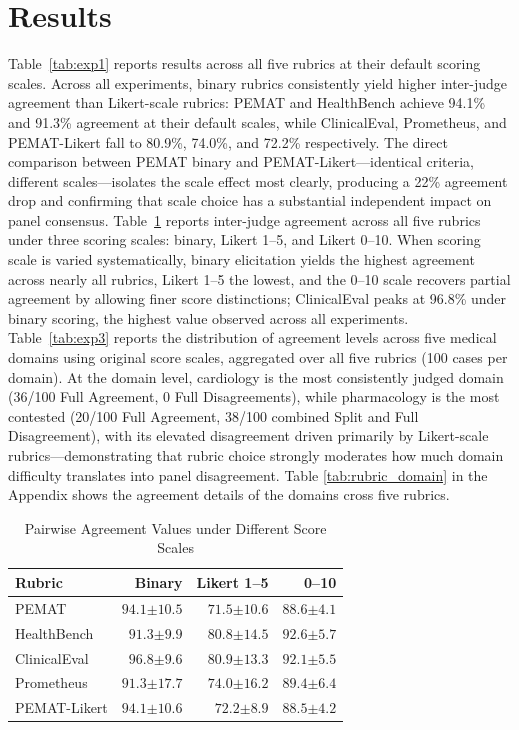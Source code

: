 \documentclass[11pt]{article}
\begin{document}
\section{Results}\label{sec:res1}

Table~\ref{tab:exp1} reports results across all five rubrics at their default scoring scales. Across all experiments, binary rubrics consistently yield higher inter-judge agreement than Likert-scale rubrics: PEMAT and HealthBench achieve 94.1\% and 91.3\% agreement at their default scales, while ClinicalEval, Prometheus, and PEMAT-Likert fall to 80.9\%, 74.0\%, and 72.2\% respectively. The direct comparison between PEMAT binary and PEMAT-Likert—identical criteria, different scales—isolates the scale effect most clearly, producing a 22\% agreement drop and confirming that scale choice has a substantial independent impact on panel consensus. Table~\ref{tab:exp2} reports inter-judge agreement across all five rubrics under three scoring scales: binary, Likert 1--5, and Likert 0--10. When scoring scale is varied systematically, binary elicitation yields the highest agreement across nearly all rubrics, Likert 1--5 the lowest, and the 0--10 scale recovers partial agreement by allowing finer score distinctions; ClinicalEval peaks at 96.8\% under binary scoring, the highest value observed across all experiments. Table~\ref{tab:exp3} reports the distribution of agreement levels across five medical domains using original score scales, aggregated over all five rubrics (100 cases per domain). At the domain level, cardiology is the most consistently judged domain (36/100 Full Agreement, 0 Full Disagreements), while pharmacology is the most contested (20/100 Full Agreement, 38/100 combined Split and Full Disagreement), with its elevated disagreement driven primarily by Likert-scale rubrics—demonstrating that rubric choice strongly moderates how much domain difficulty translates into panel disagreement. Table \ref{tab:rubric_domain} in the Appendix shows the agreement details of the domains cross five rubrics.
\begin{table}[h!]
\centering
\small
\setlength{\tabcolsep}{4pt}
\begin{tabular}{@{}lrrr@{}}
\toprule
\textbf{Rubric} & \textbf{Binary} & \textbf{Likert 1--5}
  & \textbf{0--10} \\
\midrule
PEMAT     & $\mathbf{94.1}{\scriptstyle\pm10.5}$ & $71.5{\scriptstyle\pm10.6}$ & $88.6{\scriptstyle\pm4.1}$  \\
HealthBench & $91.3{\scriptstyle\pm9.9}$  & $80.8{\scriptstyle\pm14.5}$ & $\mathbf{92.6}{\scriptstyle\pm5.7}$  \\
ClinicalEval & $\mathbf{96.8}{\scriptstyle\pm9.6}$  & $80.9{\scriptstyle\pm13.3}$ & $92.1{\scriptstyle\pm5.5}$  \\
Prometheus   & $91.3{\scriptstyle\pm17.7}$ & $74.0{\scriptstyle\pm16.2}$ & $\mathbf{89.4}{\scriptstyle\pm6.4}$  \\
PEMAT-Likert  & $\mathbf{94.1}{\scriptstyle\pm10.6}$ & $72.2{\scriptstyle\pm8.9}$  & $88.5{\scriptstyle\pm4.2}$  \\
\bottomrule
\end{tabular}
\caption{Pairwise Agreement Values under Different Score Scales}
\label{tab:exp2}
\end{table}
\end{document}
